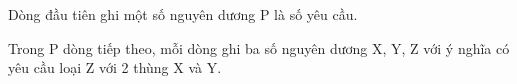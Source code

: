 Dòng đầu tiên ghi một số nguyên dương P là số yêu cầu.  

   Trong P dòng tiếp theo, mỗi dòng ghi ba số nguyên dương X, Y, Z với ý nghĩa có yêu cầu loại Z với 2 thùng X và Y.